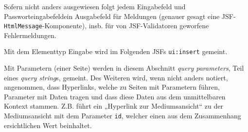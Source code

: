 \documentclass{article}
\begin{document}
\newcommand{\PUB}{jeder}
\newcommand{\ANO}{Anon.}
\newcommand{\USR}{Nutzer}
\newcommand{\BIB}{Mitarbeiter}
\newcommand{\ADM}{Admin.}

\newcommand{\component}[2]{\subsubsection{#1 (\texttt{#2})}}
\newcommand{\page}[2]{
    \subsubsection{#1}
    \paragraph*{Dateipfad} \texttt{#2.xhtml}
}

\newcommand{\Javadoc}{\paragraph*{Javadoc}}
\newcommand{\Parameter}{\paragraph*{Parameter}}

\newcommand{\BTN}{Knopf}
\newcommand{\LNK}{Hyperlink}
\newcommand{\INP}{Eingabefeld}
\newcommand{\PAS}{Passworteingabefeld}
\newcommand{\DRP}{Drop-Down-Liste}
\newcommand{\CHK}{Checkbox}
\newcommand{\OUT}{Ausgabefeld}
\newcommand{\LST}{paginierte Liste}

\newenvironment{controls}
{
    \begin{table}[H]
        \centering
        \begin{tabular}{ p{7em} p{25em} p{7em} }
            \toprule
            \textbf{Typ} & \textbf{Beschreibung} & \textbf{Sichtbarkeit}\\
            \midrule
        }
        {
            \bottomrule
        \end{tabular}
    \end{table}
}

Sofern nicht anders ausgewiesen folgt jedem Eingabefeld und \PAS ein Ausgabefeld für Meldungen (genauer gesagt eine JSF-\texttt{HtmlMessage}-Komponente), insb. für von JSF-Validatoren geworfene Fehlermeldungen.

Mit dem Elementtyp Eingabe wird im Folgenden JSFs \texttt{ui:insert} gemeint.

Mit Parametern (einer Seite) werden in diesem Abschnitt \textit{query parameters}, Teil eines \textit{query string}s, gemeint.
Des Weiteren wird, wenn nicht anders notiert, angenommen, dass \LNK{}s, welche zu Seiten mit Parametern führen, Parameter mit Daten tragen und dass diese Daten aus dem unmittelbaren Kontext stammen. Z.B. führt ein „\LNK{} zur Mediumsansicht“ zu der Mediumsansicht mit dem Parameter \texttt{id}, welcher einen aus dem Zusammenhang ersichtlichen Wert beinhaltet.
\end{document}
